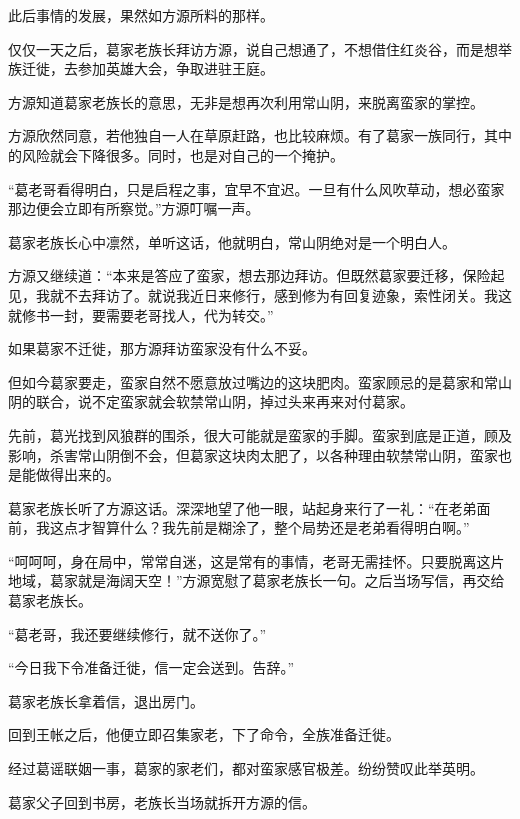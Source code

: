 
\begin{this_body}



此后事情的发展，果然如方源所料的那样。

仅仅一天之后，葛家老族长拜访方源，说自己想通了，不想借住红炎谷，而是想举族迁徙，去参加英雄大会，争取进驻王庭。

方源知道葛家老族长的意思，无非是想再次利用常山阴，来脱离蛮家的掌控。

方源欣然同意，若他独自一人在草原赶路，也比较麻烦。有了葛家一族同行，其中的风险就会下降很多。同时，也是对自己的一个掩护。

“葛老哥看得明白，只是启程之事，宜早不宜迟。一旦有什么风吹草动，想必蛮家那边便会立即有所察觉。”方源叮嘱一声。

葛家老族长心中凛然，单听这话，他就明白，常山阴绝对是一个明白人。

方源又继续道：“本来是答应了蛮家，想去那边拜访。但既然葛家要迁移，保险起见，我就不去拜访了。就说我近日来修行，感到修为有回复迹象，索性闭关。我这就修书一封，要需要老哥找人，代为转交。”

如果葛家不迁徙，那方源拜访蛮家没有什么不妥。

但如今葛家要走，蛮家自然不愿意放过嘴边的这块肥肉。蛮家顾忌的是葛家和常山阴的联合，说不定蛮家就会软禁常山阴，掉过头来再来对付葛家。

先前，葛光找到风狼群的围杀，很大可能就是蛮家的手脚。蛮家到底是正道，顾及影响，杀害常山阴倒不会，但葛家这块肉太肥了，以各种理由软禁常山阴，蛮家也是能做得出来的。

葛家老族长听了方源这话。深深地望了他一眼，站起身来行了一礼：“在老弟面前，我这点才智算什么？我先前是糊涂了，整个局势还是老弟看得明白啊。”

“呵呵呵，身在局中，常常自迷，这是常有的事情，老哥无需挂怀。只要脱离这片地域，葛家就是海阔天空！”方源宽慰了葛家老族长一句。之后当场写信，再交给葛家老族长。

“葛老哥，我还要继续修行，就不送你了。”

“今日我下令准备迁徙，信一定会送到。告辞。”

葛家老族长拿着信，退出房门。

回到王帐之后，他便立即召集家老，下了命令，全族准备迁徙。

经过葛谣联姻一事，葛家的家老们，都对蛮家感官极差。纷纷赞叹此举英明。

葛家父子回到书房，老族长当场就拆开方源的信。


\end{this_body}
